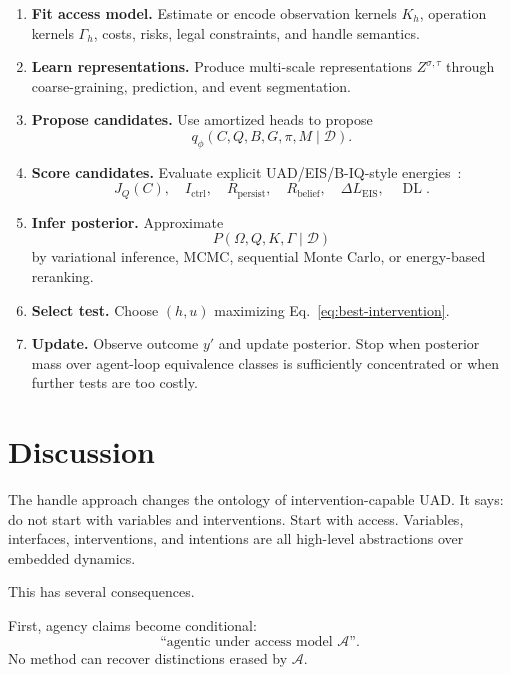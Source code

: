 \documentclass[11pt]{article}
\newcommand{\A}{\mathcal A}
\newcommand{\D}{\mathcal D}
\newcommand{\DL}{\operatorname{DL}}
\begin{document}
\begin{enumerate}[leftmargin=*]
    \item \textbf{Fit access model.}
    Estimate or encode observation kernels $K_h$, operation kernels $\Gamma_h$,
    costs, risks, legal constraints, and handle semantics.

    \item \textbf{Learn representations.}
    Produce multi-scale representations $Z^{\sigma,\tau}$ through coarse-graining,
    prediction, and event segmentation.

    \item \textbf{Propose candidates.}
    Use amortized heads to propose
    \[
        q_\phi(C,Q,B,G,\pi,M\mid \D).
    \]

    \item \textbf{Score candidates.}
    Evaluate explicit UAD/EIS/B-IQ-style energies~\cite{uad2025,eis2025,biq2025}:
    \[
        J_Q(C),\quad
        I_{\mathrm{ctrl}},\quad
        R_{\mathrm{persist}},\quad
        R_{\mathrm{belief}},\quad
        \Delta L_{\mathrm{EIS}},\quad
        \DL.
    \]

    \item \textbf{Infer posterior.}
    Approximate
    \[
        P(\Omega,Q,K,\Gamma\mid \D)
    \]
    by variational inference, MCMC, sequential Monte Carlo, or energy-based
    reranking.

    \item \textbf{Select test.}
    Choose $(h,u)$ maximizing Eq.~\eqref{eq:best-intervention}.

    \item \textbf{Update.}
    Observe outcome $y'$ and update posterior. Stop when posterior mass over
    agent-loop equivalence classes is sufficiently concentrated or when further
    tests are too costly.
\end{enumerate}

\section{Discussion}

The handle approach changes the ontology of intervention-capable UAD. It says:
do not start with variables and interventions. Start with access. Variables,
interfaces, interventions, and intentions are all high-level abstractions over
embedded dynamics.

This has several consequences.

First, agency claims become conditional:
\[
    \text{``agentic under access model } \A\text{''}.
\]
No method can recover distinctions erased by $\A$.
\end{document}

